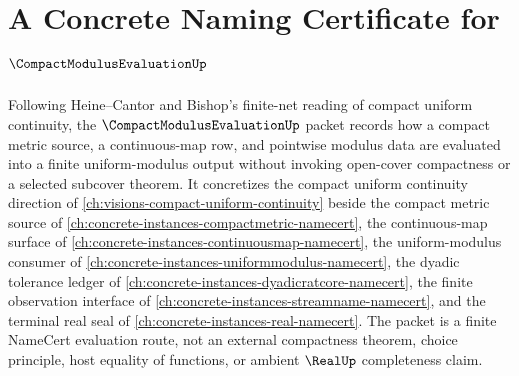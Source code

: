 \chapter{A Concrete Naming Certificate for $\CompactModulusEvaluationUp$}
\label{ch:concrete-instances-compact-modulus-evaluation-namecert}

Following Heine--Cantor and Bishop's finite-net reading of compact uniform continuity, the $\CompactModulusEvaluationUp$ packet records how a compact metric source, a continuous-map row, and pointwise modulus data are evaluated into a finite uniform-modulus output without invoking open-cover compactness or a selected subcover theorem. It concretizes the compact uniform continuity direction of \autoref{ch:visions-compact-uniform-continuity} beside the compact metric source of \autoref{ch:concrete-instances-compactmetric-namecert}, the continuous-map surface of \autoref{ch:concrete-instances-continuousmap-namecert}, the uniform-modulus consumer of \autoref{ch:concrete-instances-uniformmodulus-namecert}, the dyadic tolerance ledger of \autoref{ch:concrete-instances-dyadicratcore-namecert}, the finite observation interface of \autoref{ch:concrete-instances-streamname-namecert}, and the terminal real seal of \autoref{ch:concrete-instances-real-namecert}. The packet is a finite NameCert evaluation route, not an external compactness theorem, choice principle, host equality of functions, or ambient $\RealUp$ completeness claim.

